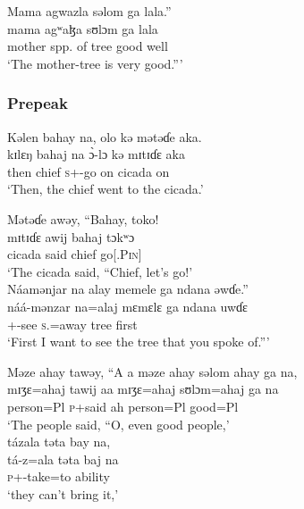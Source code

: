  \medskip
  Mama  agwazla  səlom  ga  lala.”\\
 \gll mama    agʷaɮa       sʊlɔm   ga     lala\\
 mother   {spp. of tree}     good     {\ADJ}   well\\
 \glt ‘The mother-tree is very good.”’
 \z
 
 \subsubsection*{Prepeak}
\ea   Kəlen  bahay  na,  olo  kə  mətəɗe  aka.  \\
\gll  kɪlɛŋ bahaj  na  \`ɔ-lɔ        kə  mɪtɪɗɛ  aka \\
 then    chief  {\PSP}  \textsc{s}+{\PFV}-go    on  cicada  on\\
 \glt ‘Then, the chief went to the cicada.’  
 \z
 
\ea  Mətəɗe  awəy, “Bahay,  toko! \\
\gll mɪtɪɗɛ   awij   bahaj  tɔkʷɔ\\
 cicada  said  chief   {go[{\IMP}.\textsc{Pin}}] \\
 \glt ‘The cicada said, “Chief, let’s go!’  \\
 
 \medskip
 Náamənjar  na  alay  memele  ga  ndana  əwɗe.”\\
 \gll náá{}-mənzar   na=alaj   mɛmɛlɛ ga   ndana  uwɗɛ\\
 {\oneS}+{\POT}-see   \textsc{s}.{\DO}=away   tree   {\ADJ}  {\DEM}   first\\
\glt ‘First I want to see the tree that you spoke of.”’
 \z
 
\ea  Məze  ahay  tawəy,  “A a  məze  ahay  səlom  ahay  ga  na,  \\
 \gll mɪʒɛ=ahaj  tawij   aa mɪʒɛ=ahaj   sʊlɔm=ahaj   ga   na\\
 person=Pl  \textsc{p}+said  ah  person=Pl     good=Pl   {\ADJ}   {\PSP}\\
 \glt ‘The people said, “O, even good people,’\\
 
 \medskip
 tázala  təta  bay  na,  \\
\gll  tá-z=ala     təta baj         na \\
 \textsc{p}+{\IFV}-take=to  ability  {\NEG}   {\PSP}\\
 \glt ‘they can’t bring it,’  \\
 

